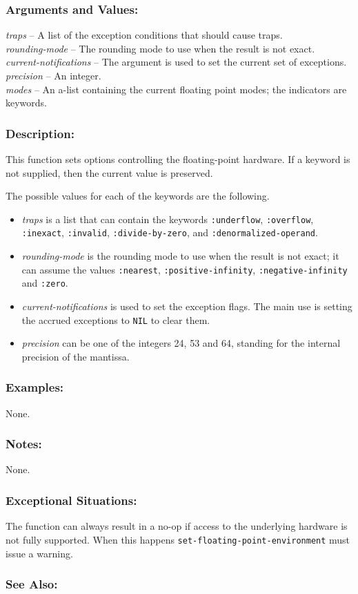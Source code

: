 \documentclass[10pt,fleqn]{article}
\newcommand{\code}[1]{\texttt{#1}}
\newcommand{\varname}[1]{\textit{#1}}
\newcommand{\DArgsNValues}{\subsubsection*{Arguments and Values:}}
\newcommand{\DDescription}{\subsubsection*{Description:}}
\newcommand{\DExamples}{\subsubsection*{Examples:}}
\newcommand{\DExceptional}{\subsubsection*{Exceptional Situations:}}
\newcommand{\DNotes}{\subsubsection*{Notes:}}
\newcommand{\DSeeAlso}{\subsubsection*{See Also:}}
\begin{document}
\DArgsNValues{}

\varname{traps} -- A list of the exception conditions that should cause
traps.\\
\varname{rounding-mode} -- The rounding mode to use when the result is
not exact.\\
\varname{current-notifications} -- The argument is used to set the current
set of exceptions.\\
\varname{precision} -- An integer.\\
\varname{modes} -- An a-list containing the current floating
point modes; the indicators are keywords.

\DDescription{}

This function sets options controlling the floating-point
hardware. If a keyword is not supplied, then the current value is
preserved.

The possible values for each of the keywords are the
following.

\begin{itemize}
\item \varname{traps} is a list that can contain the keywords
  \code{:underflow}, \code{:overflow}, \code{:inexact}, \code{:invalid},
  \code{:divide-by-zero}, and \code{:denormalized-operand}.

\item \varname{rounding-mode} is the rounding mode to use when the result is
  not exact; it can assume the values \code{:nearest},
  \code{:positive-infinity}, \code{:negative-infinity} and
  \code{:zero}.

\item \varname{current-notifications} is used to set the exception flags. The
  main use is setting the accrued exceptions to \code{NIL} to clear
  them.

\item \varname{precision} can be one of the integers 24, 53 and 64, standing for
  the internal precision of the mantissa.
\end{itemize}

\DExamples{}

None.


\DNotes{}

None.


\DExceptional{}

The function can always result in a no-op if access to the underlying
hardware is not fully supported.  When this happens
\code{set-floating-point-environment} must issue a warning.


\DSeeAlso{}
\end{document}
